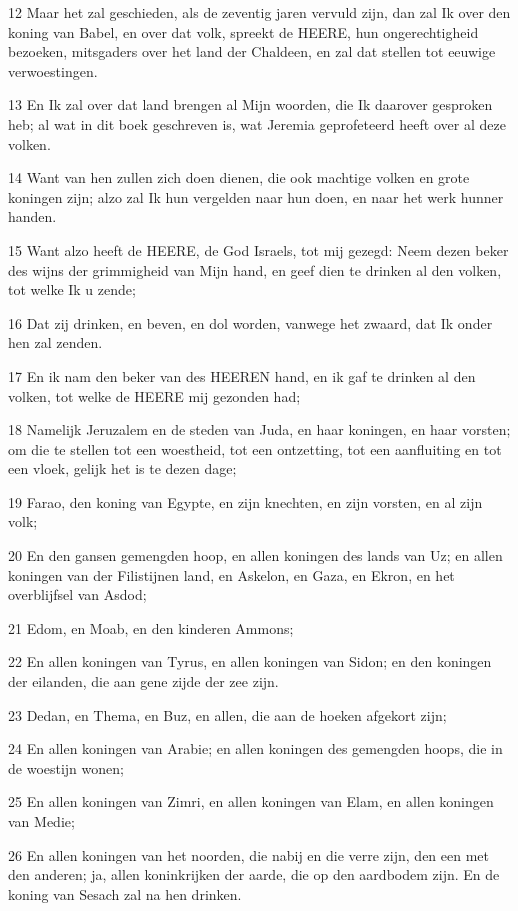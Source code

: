 \par 12 Maar het zal geschieden, als de zeventig jaren vervuld zijn, dan zal Ik over den koning van Babel, en over dat volk, spreekt de HEERE, hun ongerechtigheid bezoeken, mitsgaders over het land der Chaldeen, en zal dat stellen tot eeuwige verwoestingen.
\par 13 En Ik zal over dat land brengen al Mijn woorden, die Ik daarover gesproken heb; al wat in dit boek geschreven is, wat Jeremia geprofeteerd heeft over al deze volken.
\par 14 Want van hen zullen zich doen dienen, die ook machtige volken en grote koningen zijn; alzo zal Ik hun vergelden naar hun doen, en naar het werk hunner handen.
\par 15 Want alzo heeft de HEERE, de God Israels, tot mij gezegd: Neem dezen beker des wijns der grimmigheid van Mijn hand, en geef dien te drinken al den volken, tot welke Ik u zende;
\par 16 Dat zij drinken, en beven, en dol worden, vanwege het zwaard, dat Ik onder hen zal zenden.
\par 17 En ik nam den beker van des HEEREN hand, en ik gaf te drinken al den volken, tot welke de HEERE mij gezonden had;
\par 18 Namelijk Jeruzalem en de steden van Juda, en haar koningen, en haar vorsten; om die te stellen tot een woestheid, tot een ontzetting, tot een aanfluiting en tot een vloek, gelijk het is te dezen dage;
\par 19 Farao, den koning van Egypte, en zijn knechten, en zijn vorsten, en al zijn volk;
\par 20 En den gansen gemengden hoop, en allen koningen des lands van Uz; en allen koningen van der Filistijnen land, en Askelon, en Gaza, en Ekron, en het overblijfsel van Asdod;
\par 21 Edom, en Moab, en den kinderen Ammons;
\par 22 En allen koningen van Tyrus, en allen koningen van Sidon; en den koningen der eilanden, die aan gene zijde der zee zijn.
\par 23 Dedan, en Thema, en Buz, en allen, die aan de hoeken afgekort zijn;
\par 24 En allen koningen van Arabie; en allen koningen des gemengden hoops, die in de woestijn wonen;
\par 25 En allen koningen van Zimri, en allen koningen van Elam, en allen koningen van Medie;
\par 26 En allen koningen van het noorden, die nabij en die verre zijn, den een met den anderen; ja, allen koninkrijken der aarde, die op den aardbodem zijn. En de koning van Sesach zal na hen drinken.
